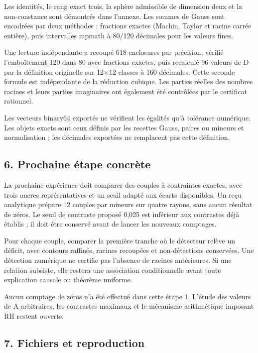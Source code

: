 \documentclass[
  10pt,
  a4paper,
]{article}
\begin{document}
Les identités, le rang exact trois, la sphère admissible de dimension
deux et la non-constance sont démontrés dans l'annexe. Les sommes de
Gauss sont encadrées par deux méthodes : fractions exactes (Machin,
Taylor et racine carrée entière), puis intervalles mpmath à 80/120
décimales pour les valeurs fines.

Une lecture indépendante a recoupé 618 enclosures par précision, vérifié
l'emboîtement 120 dans 80 avec fractions exactes, puis recalculé 96
valeurs de D par la définition originelle sur 12×12 classes à 160
décimales. Cette seconde formule est indépendante de la réduction
cubique. Les parties réelles des nombres racines et leurs parties
imaginaires ont également été contrôlées par le certificat rationnel.

Les vecteurs binary64 exportés ne vérifient les égalités qu'à tolérance
numérique. Les objets exacts sont ceux définis par les recettes Gauss,
paires ou mineurs et normalisation ; les décimales exportées ne
remplacent pas cette définition.

\hypertarget{prochaine-uxe9tape-concruxe8te}{%
\subsection{6. Prochaine étape
concrète}\label{prochaine-uxe9tape-concruxe8te}}

La prochaine expérience doit comparer des couples à contraintes exactes,
avec trois ancres représentatives et un seuil adapté aux écarts
disponibles. Un reçu analytique prépare 12 couples par mineurs sur
quatre rayons, sans aucun résultat de zéros. Le seuil de contraste
proposé 0,025 est inférieur aux contrastes déjà établis ; il doit être
conservé avant de lancer les nouveaux comptages.

Pour chaque couple, comparer la première tranche où le détecteur relève
un déficit, avec contours raffinés, racines recoupées et non-détections
conservées. Une détection numérique ne certifie pas l'absence de racines
antérieures. Si une relation subsiste, elle restera une association
conditionnelle avant toute explication causale ou théorème uniforme.

Aucun comptage de zéros n'a été effectué dans cette étape 1. L'étude des
valeurs de A arbitraires, les contrastes maximaux et le mécanisme
arithmétique imposant RH restent ouverts.

\hypertarget{fichiers-et-reproduction}{%
\subsection{7. Fichiers et
reproduction}\label{fichiers-et-reproduction}}
\end{document}
